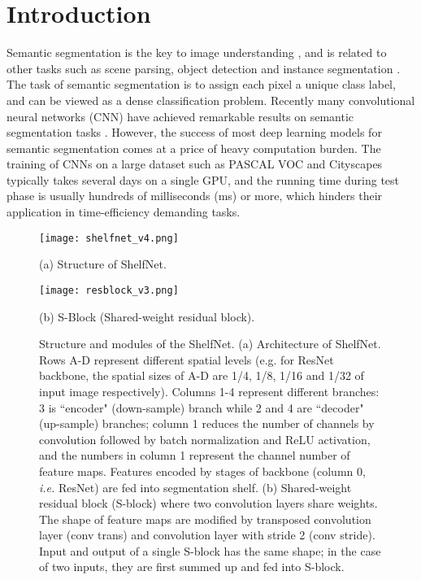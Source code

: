 \documentclass[10pt,twocolumn,letterpaper]{article}
\begin{document}
\section{Introduction}
\label{introduction}
Semantic segmentation is the key to image understanding \cite{everingham2015pascal,mottaghi2014role}, and is related to other tasks such as scene parsing, object detection and instance segmentation \cite{lin2014microsoft, zhou2017scene}. 
The task of semantic segmentation is to assign each pixel a unique class label, and can be viewed as a dense classification problem. Recently many convolutional neural networks (CNN) have achieved remarkable results on semantic segmentation tasks \cite{long2015fully,chen2016deeplab,zhao2017pyramid}. However, the success of most deep learning models for semantic segmentation comes at a price of heavy computation burden. The training of CNNs on a large dataset such as PASCAL VOC \cite{everingham2015pascal} and Cityscapes \cite{cordts2016cityscapes} typically takes several days on a single GPU, and the running time during test phase is usually hundreds of milliseconds (ms) or more, which hinders their application in time-efficiency demanding tasks.






\begin{figure*}[t!]
    \centering
    \begin{minipage}{.7\textwidth}
        \centering
        \texttt{[image: shelfnet\_v4.png]}
        \caption*{\small{(a) Structure of ShelfNet.}}
    \end{minipage}\begin{minipage}{0.25\textwidth}
        \centering
        \texttt{[image: resblock\_v3.png]}
        \caption*{\small{(b) S-Block (Shared-weight residual block).}}
    \end{minipage}
    \caption{\small{Structure and modules of the ShelfNet. (a) Architecture of ShelfNet. Rows A-D represent different spatial levels (e.g. for ResNet backbone, the spatial sizes of A-D are 1/4, 1/8, 1/16 and 1/32 of input image respectively). Columns 1-4 represent different branches: 3 is ``encoder" (down-sample) branch while 2 and 4 are ``decoder" (up-sample) branches; column 1 reduces the number of channels by  convolution followed by batch normalization and ReLU activation, and the numbers in column 1 represent the channel number of feature maps. Features encoded by stages of backbone (column 0, \textit{i.e.} ResNet) are fed into segmentation shelf. (b) Shared-weight residual block (S-block) where two convolution layers share weights. The shape of feature maps are modified by transposed convolution layer (conv trans) and convolution layer with stride 2 (conv stride). Input and output of a single S-block has the same shape; in the case of two inputs, they are first summed up and fed into S-block.} }
    \label{fig:shelfnet}
\end{figure*}
\end{document}

